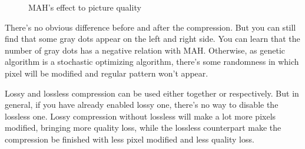 \documentclass{article}
\begin{document}
    \begin{figure}[htbp]
        \centering
        \caption{MAH's effect to picture quality}
    \end{figure}

    There's no obvious difference before and after the compression. But you can still find that some gray dots appear on the left and right side. You can learn that the number of gray dots has a negative relation with MAH. Otherwise, as genetic algorithm is a stochastic optimizing algorithm, there's some randomness in which pixel will be modified and regular pattern won't appear.

    Lossy and lossless compression can be used either together or respectively. But in general, if you have already enabled lossy one, there's no way to disable the lossless one. Lossy compression without lossless will make a lot more pixels modified, bringing more quality loss, while the lossless counterpart make the compression be finished with less pixel modified and less quality loss.
    
\end{document}
